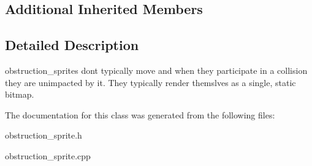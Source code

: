 \subsection*{Additional Inherited Members}


\subsection{Detailed Description}
obstruction\+\_\+sprites don\textquotesingle{}t typically move and when they participate in a collision they are unimpacted by it. They typically render themslves as a single, static bitmap. 

The documentation for this class was generated from the following files\+:\begin{DoxyCompactItemize}
\item 
obstruction\+\_\+sprite.\+h\item 
obstruction\+\_\+sprite.\+cpp\end{DoxyCompactItemize}
